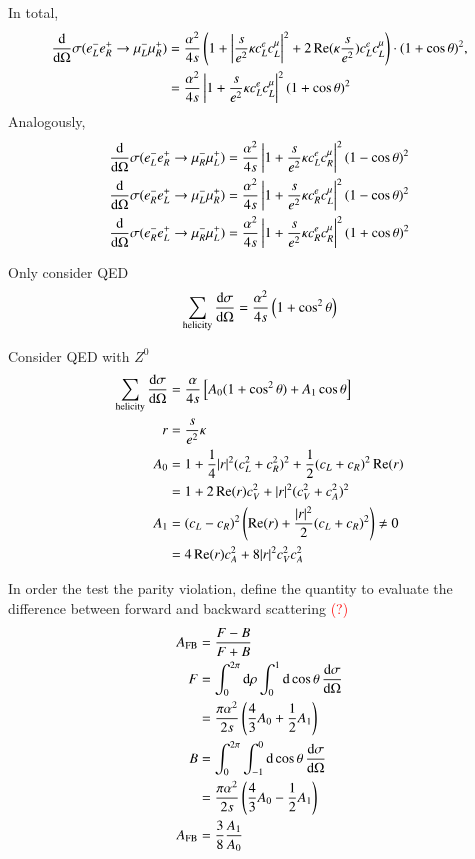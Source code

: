 In total,
\begin{align}
   \dv{\Omega} \sigma (e^-_L e^+_R \rightarrow \mu^-_L \mu_R^+) &= \frac{\alpha^2}{4 s } \left( 1 + \left| \frac{s}{e^2}\kappa c_L^e c_L^\mu \right|^2 + 2 \Re(\kappa \frac{s}{e^2}) c_L^e c_L^\mu \right) \cdot (1+\cos \theta)^2, \notag \\
                       &= \frac{\alpha^2}{4 s} \left| 1 + \frac{s}{e^2} \kappa c_L^e c_L^\mu \right|^2 (1+\cos \theta)^2
\end{align}
Analogously,
\begin{align}
    \dv{\Omega} \sigma(e^-_L e^+_R \rightarrow \mu^-_R \mu_L^+) &= \frac{\alpha^2}{4 s} \left| 1 + \frac{s}{e^2} \kappa c_L^e c_R^\mu \right|^2 (1 - \cos \theta)^2 \\
    \dv{\Omega} \sigma(e^-_R e^+_L \rightarrow \mu^-_L \mu_R^+) &= \frac{\alpha^2}{4 s} \left| 1 + \frac{s}{e^2} \kappa c_R^e c_L^\mu \right|^2 (1 - \cos \theta)^2 \\
    \dv{\Omega} \sigma(e^-_R e^+_L \rightarrow \mu^-_R \mu_L^+) &= \frac{\alpha^2}{4 s} \left| 1 + \frac{s}{e^2} \kappa c_R^e c_R^\mu \right|^2 (1 + \cos \theta)^2
\end{align}

Only consider QED
\begin{align*}
   \sum_{\text{helicity}} \dv{\sigma}{\Omega} = \frac{\alpha^2}{4s} \left( 1 + \cos^2 \theta \right)
\end{align*}

Consider QED with $Z^0$
\begin{align*}
   \sum_\text{helicity} \dv{\sigma}{\Omega} &= \frac{\alpha}{4 s} \left[ A_0(1+\cos^2 \theta) + A_1 \cos \theta \right] \\
   r &= \frac{s}{e^2} \kappa \\
   A_0 &= 1 + \frac{1}{4} |r|^2 (c_L^2 + c_R^2)^2 + \frac{1}{2} (c_L + c_R)^2 \Re(r) \\
       &= 1 + 2 \Re(r) c_V^2 + |r|^2 (c_V^2 + c_A^2)^2 \\
   A_1 &= (c_L - c_R)^2 \left( \Re(r) + \frac{|r|^2}{2} (c_L + c_R)^2 \right) \neq 0 \\
       &= 4 \Re(r) c_A^2 + 8 |r|^2 c_V^2 c_A^2
\end{align*}

In order the test the parity violation, define the quantity to evaluate the difference between forward and backward scattering \textcolor{red}{(?)}
\begin{align*}
   A_{\text{FB}} &= \frac{F - B }{ F + B} \\
   F &= \int_0^{2\pi} \dd{\rho} \int_0^1 \dd{\cos \theta} \dv{\sigma}{\Omega} \\
     &= \frac{\pi \alpha^2}{2s} \left( \frac{4}{3} A_0 + \frac{1}{2} A_1\right) \\
   B &= \int_0^{2\pi} \int_{-1}^{0}\dd{\cos \theta} \dv{\sigma}{\Omega} \\
     &= \frac{\pi \alpha^2}{2s} \left( \frac{4}{3} A_0 - \frac{1}{2} A_1 \right) \\
   A_{\text{FB}} &= \frac{3}{8} \frac{A_1}{A_0}
\end{align*}

